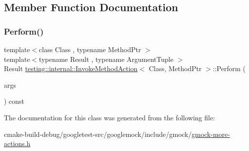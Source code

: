 \subsection{Member Function Documentation}
\mbox{\label{classtesting_1_1internal_1_1InvokeMethodAction_aed6971c668bc2c7671d512306b25b1ab}} 
\subsubsection{\texorpdfstring{Perform()}{Perform()}}
{\footnotesize\ttfamily template$<$class Class , typename Method\+Ptr $>$ \\
template$<$typename Result , typename Argument\+Tuple $>$ \\
Result \mbox{\hyperlink{classtesting_1_1internal_1_1InvokeMethodAction}{testing\+::internal\+::\+Invoke\+Method\+Action}}$<$ Class, Method\+Ptr $>$\+::Perform (\begin{DoxyParamCaption}\item[{const Argument\+Tuple \&}]{args }\end{DoxyParamCaption}) const\hspace{0.3cm}{\ttfamily [inline]}}



The documentation for this class was generated from the following file\+:\begin{DoxyCompactItemize}
\item 
cmake-\/build-\/debug/googletest-\/src/googlemock/include/gmock/\mbox{\hyperlink{gmock-more-actions_8h}{gmock-\/more-\/actions.\+h}}\end{DoxyCompactItemize}
